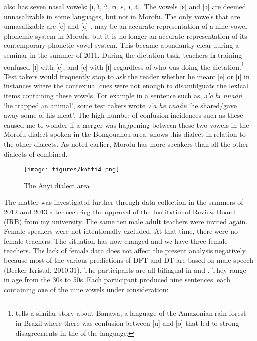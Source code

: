\documentclass[output=paper,
modfonts
]{langscibook}
\begin{document}
 also has seven nasal vowels: [ɪ, \~\i, \~u, ʊ, ɛ, ɔ, ã]. The vowels [ɛ] and [ɔ] are deemed unnasalizable in some  languages, but not in Morofu. The only vowels that are unnasalizable are [e] and [o] \citep{Koffi2004}.
 may be an accurate representation of a nine-vowel phonemic system in  Morofu, but it is no longer an accurate representation of its contemporary phonetic vowel system. This became abundantly clear during a  seminar in the summer of 2011. During the dictation task, teachers in training confused [ɪ] with [e], and [e] with [ɪ] regardless of who was doing the dictation.\footnote{\citet[126,130--131]{Ladefoged2003} tells a similar story about Banawa, a language of the Amazonian rain forest in Brazil where there was confusion between [u] and [o] that led to strong disagreements in the  of the language.} Test takers would frequently stop to ask the reader whether he meant [e] or [ɪ] in instances where the contextual cues were not enough to disambiguate the lexical items containing these vowels. For example in a sentence such as, \textit{ɔ’a hɪ nnaán} ‘he trapped an animal’, some test takers wrote \textit{ɔ’a he nnaán} ‘he shared/gave away some of his meat’. The high number of confusion incidences such as these caused me to wonder if a merger was happening between these two vowels in the Morofu dialect spoken in the Bongouanou area.  shows this dialect in relation to the other  dialects. As noted earlier, Morofu has more speakers than all the other dialects of  combined.

\begin{figure}
\texttt{[image: figures/koffi4.png]}
\caption{The Anyi dialect area}
\label{fig:koffi:4}
\end{figure}

The matter was investigated further through data collection in the summers of 2012 and 2013 after securing the approval of the Institutional Review Board (IRB) from my university. The same ten male adult  teachers were invited again. Female speakers were not intentionally excluded. At that time, there were no female  teachers. The situation has now changed and we have three female teachers. The lack of female data does not affect the present analysis negatively because most of the various predictions of DFT and DT are based on male speech (Becker-Kristal, 2010:31). The participants are all bilingual in  and . They range in age from the 30s to 50s. Each participant produced nine sentences, each containing one of the nine vowels under consideration:
 
\end{document}
